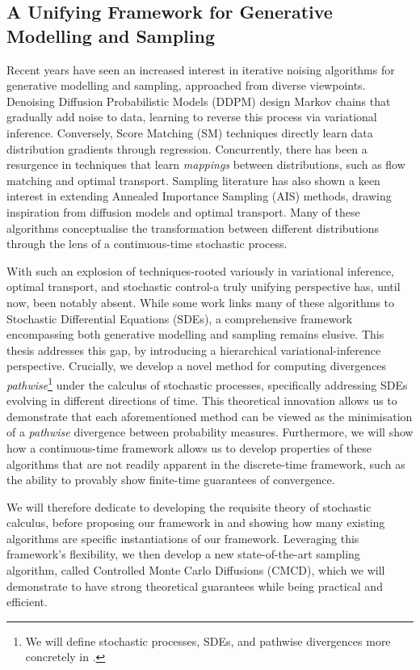 \subsection{A Unifying Framework for Generative Modelling and Sampling}

Recent years have seen an increased interest in iterative noising algorithms for generative modelling and sampling, approached from diverse viewpoints. Denoising Diffusion Probabilistic Models (DDPM) design Markov chains that gradually add noise to data, learning to reverse this process via variational inference. Conversely, Score Matching (SM) techniques directly learn data distribution gradients through regression. Concurrently, there has been a resurgence in techniques that learn \emph{mappings} between distributions, such as flow matching and optimal transport. Sampling literature has also shown a keen interest in extending Annealed Importance Sampling (AIS) methods, drawing inspiration from diffusion models and optimal transport. Many of these algorithms conceptualise the transformation between different distributions through the lens of a continuous-time stochastic process.

With such an explosion of techniques-rooted variously in variational inference, optimal transport, and stochastic control-a truly unifying perspective has, until now, been notably absent. While some work links many of these algorithms to Stochastic Differential Equations (SDEs), a comprehensive framework encompassing both generative modelling and sampling remains elusive. This thesis addresses this gap, by introducing a hierarchical variational-inference perspective. Crucially, we develop a novel method for computing divergences \emph{pathwise}\footnote{We will define stochastic processes, SDEs, and pathwise divergences more concretely in .} under the calculus of stochastic processes, specifically addressing SDEs evolving in different directions of time. This theoretical innovation allows us to demonstrate that each aforementioned method can be viewed as the minimisation of a \emph{pathwise} divergence between probability measures. Furthermore, we will show how a continuous-time framework allows us to develop properties of these algorithms that are not readily apparent in the discrete-time framework, such as the ability to provably show finite-time guarantees of convergence.

We will therefore dedicate  to developing the requisite theory of stochastic calculus, before proposing our framework in  and showing how many existing algorithms are specific instantiations of our framework. Leveraging this framework's flexibility, we then develop a new state-of-the-art sampling algorithm, called Controlled Monte Carlo Diffusions (CMCD), which we will demonstrate to have strong theoretical guarantees while being practical and efficient. 

